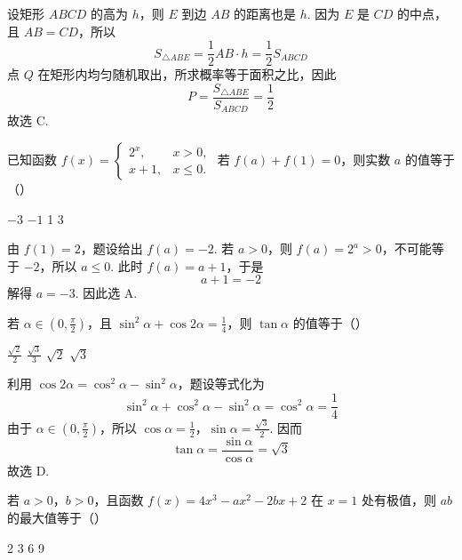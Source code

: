 
\begin{solution}
设矩形 \(ABCD\) 的高为 \(h\)，则 \(E\) 到边 \(AB\) 的距离也是 \(h\). 因为 \(E\) 是 \(CD\) 的中点，且 \(AB=CD\)，所以
\[
S_{\triangle ABE}=\frac12 AB\cdot h=\frac12 S_{ABCD}
\]
点 \(Q\) 在矩形内均匀随机取出，所求概率等于面积之比，因此
\[
P=\frac{S_{\triangle ABE}}{S_{ABCD}}=\frac12
\]
故选 C.
\end{solution}

\begin{problem}
已知函数 \( f(x) = \begin{cases}
2^x, & x > 0,\\
x + 1, & x \leqslant 0.
\end{cases} \) 若 \( f(a) + f(1) = 0 \)，则实数 \( a \) 的值等于（\quad）

\choices
    {\(-3\)}
    {\(-1\)}
    {1}
    {3}
\end{problem}


\begin{solution}
由 \(f(1)=2\)，题设给出 \(f(a)=-2\). 若 \(a>0\)，则 \(f(a)=2^a>0\)，不可能等于 \(-2\)，所以 \(a\leqslant0\). 此时 \(f(a)=a+1\)，于是
\[
a+1=-2
\]
解得 \(a=-3\). 因此选 A.
\end{solution}

\begin{problem}
若 \(\alpha \in \left(0, \frac{\pi}{2}\right)\)，且 \(\sin^2\alpha + \cos 2\alpha = \frac{1}{4}\)，则 \(\tan \alpha\) 的值等于（\quad）

\choices
    {\(\frac{\sqrt{2}}{2}\)}
    {\( \frac{\sqrt{3}}{3} \)}
    {\(\sqrt{2}\)}
    {\(\sqrt{3}\)}
\end{problem}


\begin{solution}
利用 \(\cos2\alpha=\cos^2\alpha-\sin^2\alpha\)，题设等式化为
\[
\sin^2\alpha+\cos^2\alpha-\sin^2\alpha=\cos^2\alpha=\frac14
\]
由于 \(\alpha\in\left(0,\frac{\pi}{2}\right)\)，所以 \(\cos\alpha=\frac12\)，\(\sin\alpha=\frac{\sqrt3}{2}\). 因而
\[
\tan\alpha=\frac{\sin\alpha}{\cos\alpha}=\sqrt3
\]
故选 D.
\end{solution}

\begin{problem}
若 \(a > 0\)，\(b > 0\)，且函数 \(f(x) = 4x^3 - ax^2 - 2bx + 2\) 在 \(x = 1\) 处有极值，则 \(ab\) 的最大值等于（\quad）

\choices
    {2}
    {3}
    {6}
    {9}
\end{problem}


